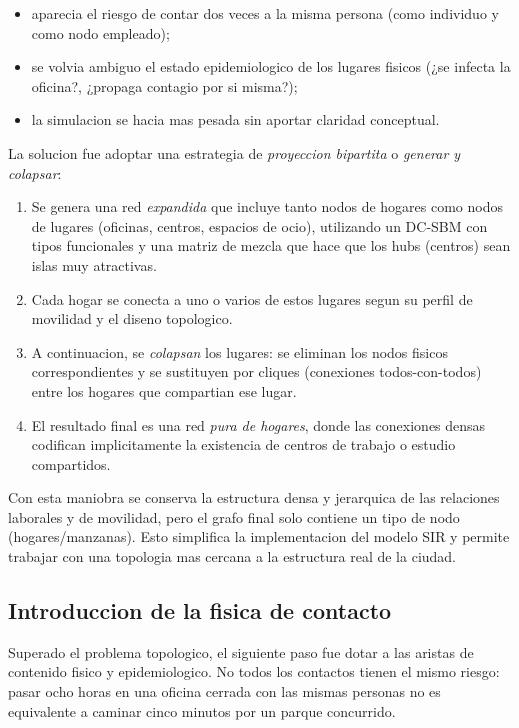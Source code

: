 \begin{itemize}
    \item aparecia el riesgo de contar dos veces a la misma persona (como individuo y como nodo empleado);
    \item se volvia ambiguo el estado epidemiologico de los lugares fisicos (¿se infecta la oficina?, ¿propaga contagio por si misma?);
    \item la simulacion se hacia mas pesada sin aportar claridad conceptual.
\end{itemize}

La solucion fue adoptar una estrategia de \emph{proyeccion bipartita} o \emph{generar y colapsar}:

\begin{enumerate}
    \item Se genera una red \emph{expandida} que incluye tanto nodos de hogares como nodos de lugares (oficinas, centros, espacios de ocio), utilizando un DC-SBM con tipos funcionales y una matriz de mezcla que hace que los hubs (centros) sean islas muy atractivas.
    \item Cada hogar se conecta a uno o varios de estos lugares segun su perfil de movilidad y el diseno topologico.
    \item A continuacion, se \emph{colapsan} los lugares: se eliminan los nodos fisicos correspondientes y se sustituyen por cliques (conexiones todos-con-todos) entre los hogares que compartian ese lugar.
    \item El resultado final es una red \emph{pura de hogares}, donde las conexiones densas codifican implicitamente la existencia de centros de trabajo o estudio compartidos.
\end{enumerate}

Con esta maniobra se conserva la estructura densa y jerarquica de las relaciones laborales y de movilidad, pero el grafo final solo contiene un tipo de nodo (hogares/manzanas). Esto simplifica la implementacion del modelo SIR y permite trabajar con una topologia mas cercana a la estructura real de la ciudad.

\subsection{Introduccion de la fisica de contacto}

Superado el problema topologico, el siguiente paso fue dotar a las aristas de contenido fisico y epidemiologico. No todos los contactos tienen el mismo riesgo: pasar ocho horas en una oficina cerrada con las mismas personas no es equivalente a caminar cinco minutos por un parque concurrido.

